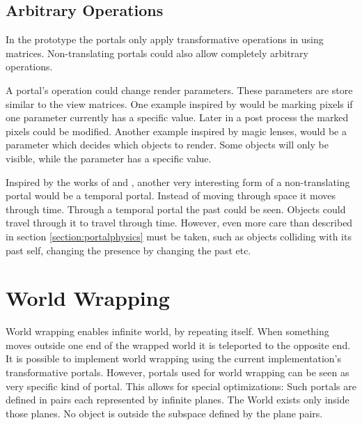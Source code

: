 \subsection{Arbitrary Operations}

In the prototype the portals only apply transformative operations in using matrices. Non-translating portals could also allow completely arbitrary operations.

A portal's operation could change render parameters. These parameters are store similar to the view matrices. One example inspired by \cite{borst:2009:real} would be marking pixels if one parameter currently has a specific value. Later in a post process the marked pixels could be modified. Another example inspired by magic lenses, would be a parameter which decides which objects to render. Some objects will only be visible, while the parameter has a specific value.

Inspired by the works of \textcite{ryall:2005:temporal} and \textcite{tiesel:2009:composable}, another very interesting form of a non-translating portal would be a temporal portal. Instead of moving through space it moves through time. Through a temporal portal the past could be seen. Objects could travel through it to travel through time. However, even more care than described in section \ref{section:portalphysics} must be taken, such as objects colliding with its past self, changing the presence by changing the past etc.










\section{World Wrapping}
World wrapping enables infinite world, by repeating itself. When something moves outside one end of the wrapped world it is teleported to the opposite end. It is possible to implement world wrapping using the current implementation's transformative portals. However, portals used for world wrapping can be seen as very specific kind of portal. This allows for special optimizations: Such portals are defined in pairs each represented by infinite planes. The World exists only inside those planes. No object is outside the subspace defined by the plane pairs. 

